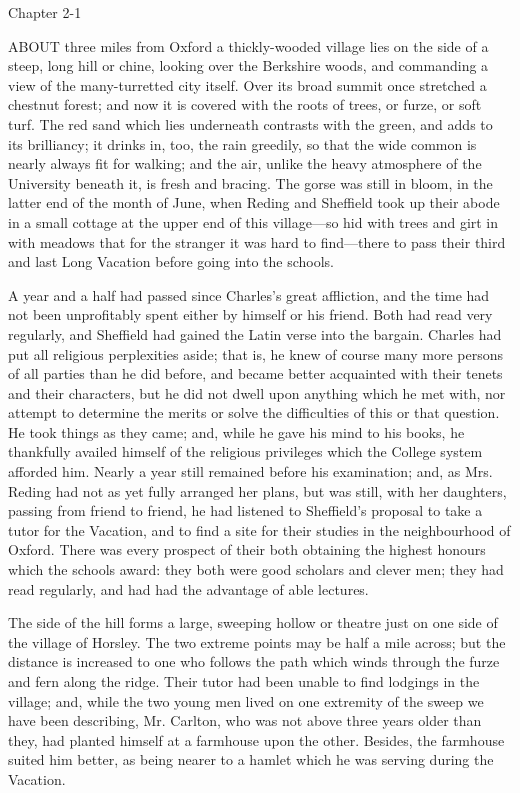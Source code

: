 Chapter 2-1



ABOUT three miles from Oxford a
thickly-wooded village lies on the side of a steep, long hill or
chine, looking over the Berkshire woods, and commanding a view of the
many-turretted city itself. Over its broad summit once stretched a
chestnut forest; and now it is covered with the roots of trees, or
furze, or soft turf. The red sand which lies underneath contrasts with
the green, and adds to its brilliancy; it drinks in, too, the rain
greedily, so that the wide common is nearly always fit for walking;
and the air, unlike the heavy atmosphere of the University beneath it,
is fresh and bracing. The gorse was still in bloom, in the latter end
of the month of June, when Reding and Sheffield took up their abode in
a small cottage at the upper end of this village—so hid with trees
and girt in with meadows that for the stranger it was hard to find—there
to pass their third and last Long Vacation before going into the
schools.

A year and a half had passed since Charles's great affliction, and
the time had not been unprofitably spent either by himself or his
friend. Both had read very regularly, and Sheffield had gained
the Latin verse into the bargain. Charles had put all religious
perplexities aside; that is, he knew of course many more persons of
all parties than he did before, and became better acquainted with
their tenets and their characters, but he did not dwell upon anything
which he met with, nor attempt to determine the merits or solve the
difficulties of this or that question. He took things as they came;
and, while he gave his mind to his books, he thankfully availed
himself of the religious privileges which the College system afforded
him. Nearly a year still remained before his examination; and, as Mrs.
Reding had not as yet fully arranged her plans, but was still, with
her daughters, passing from friend to friend, he had listened to
Sheffield's proposal to take a tutor for the Vacation, and to find a
site for their studies in the neighbourhood of Oxford. There was every
prospect of their both obtaining the highest honours which the schools
award: they both were good scholars and clever men; they had read
regularly, and had had the advantage of able lectures.

The side of the hill forms a large, sweeping hollow or theatre just
on one side of the village of Horsley. The two extreme points may be
half a mile across; but the distance is increased to one who follows
the path which winds through the furze and fern along the ridge. Their
tutor had been unable to find lodgings in the village; and, while the
two young men lived on one extremity of the sweep we have been
describing, Mr. Carlton, who was not above three years older than
they, had planted himself at a farmhouse upon the other.
Besides, the farmhouse suited him better, as being nearer to a hamlet
which he was serving during the Vacation.

